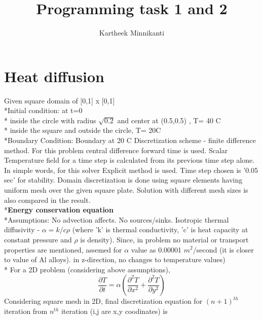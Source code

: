 \documentclass[11pt]{article}
\begin{document}
\title{Programming task 1 and 2}

\author{Kartheek Minnikanti}

\maketitle

\section{Heat diffusion}

Given square domain of [0,1] x [0,1]
\\*Initial condition: at t=0
\\*	inside the circle with radius $\sqrt{0.2}$ and center at (0.5,0.5) , T= 40 C
\\*	inside the square and outside the circle, T= 20C
\\*Boundary Condition:  Boundary at 20 C
Discretization scheme - finite difference method. For this problem central difference forward time is used. Scalar Temperature  field for a time step is calculated from its previous time step alone. In simple words, for this solver Explicit method is used. Time step chosen is '0.05 sec' for stability. Domain discretization is done using square elements having uniform mesh over the given square plate. Solution with different mesh sizes is also compared in the result.
\\*\textbf{Energy conservation equation}
\\*Assumptions: No advection affects. No sources/sinks. Isotropic thermal diffusivity - $\alpha =k / c \rho $ (where 'k' is thermal conductivity, 'c' is heat capacity at constant pressure and $\rho$ is density). Since, in problem no material or transport properties are mentioned, assemed for $\alpha$ value as 0.00001 $m^2$/second (it is closer to value of Al alloys). in z-direction, no changes to temperature values)
\\* For a 2D problem (considering above assumptions),
\begin{equation}
\frac{\partial T}{\partial t} = \alpha (\frac{\partial^2 T}{\partial x^2}+\frac{\partial^2 T}{\partial y^2})
\end{equation}
Considering square mesh in 2D, final discretization equation for $(n+1)^{th}$ iteration from $n^{th}$ iteration (i,j are x,y coodinates) is 
\end{document}
